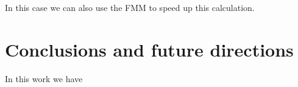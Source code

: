 \documentclass[11pt, oneside]{article}
\DeclareMathOperator\erf{erf}
\begin{document}
In this case we can also use the FMM to speed up this calculation.



\section{Conclusions and future directions}
\label{sec_conclusions}

In this work we have 









  
\end{document}
